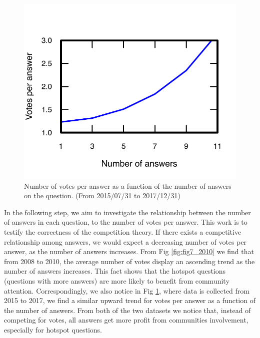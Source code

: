 \begin{figure}[!t]
    \centering
    \includegraphics[width=0.8\columnwidth]{img/Fig7_2017.pdf}
    \caption{Number of votes per answer as a function of the number of answers on the question. (From 2015/07/31 to 2017/12/31)}
    \label{fig:fig7_2017}
\end{figure}
In the following step, we aim to investigate the relationship between the number of answers in each question, to the number of votes per answer. This work is to testify the correctness of the competition theory. If there exists a competitive relationship among answers, we would expect a decreasing number of votes per answer, as the number of answers increases. From Fig \ref{fig:fig7_2010} we find that from 2008 to 2010, the average number of votes display an ascending trend as the number of answers increases. This fact shows that the hotspot questions (questions with more answers) are more likely to benefit from community attention. Correspondingly, we also notice in Fig \ref{fig:fig7_2017}, where data is collected from 2015 to 2017, we find a similar upward trend for votes per answer as a function of the number of answers. From both of the two datasets we notice that, instead of competing for votes, all answers get more profit from communities involvement, especially for hotspot questions. 

